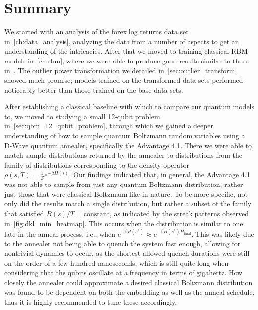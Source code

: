 \section{Summary}
We started with an analysis of the forex log returns data set in~\cref{ch:data_analysis}, analyzing the data from a number of aspects to get an understanding of the intricacies.
After that we moved to training classical RBM models in~\cref{ch:rbm}, where we were able to produce good results similar to those in~\cite{kondratyev_2019}.
The outlier power transformation we detailed in~\cref{sec:outlier_transform} showed much promise; models trained on the transformed data sets performed noticeably better than those trained on the base data sets.

After establishing a classical baseline with which to compare our quantum models to, we moved to studying a small 12-qubit problem in~\cref{sec:qbm_12_qubit_problem}, through which we gained a deeper understanding of how to sample quantum Boltzmann random variables using a D-Wave quantum annealer, specifically the Advantage 4.1.
There we were able to match sample distributions returned by the annealer to distributions from the family of distributions corresponding to the density operator \( \rho(s,T) = \frac{1}{Z}e^{-\beta H(s)} \).
Our findings indicated that, in general, the Advantage 4.1 was not able to sample from just any quantum Boltzmann distribution, rather just those that were classical Boltzmann-like in nature.
To be more specific, not only did the results match a single distribution, but rather a subset of the family that satisfied \( B(s) / T = \text{constant} \), as indicated by the streak patterns observed in~\cref{fig:dkl_min_heatmap}.
This occurs when the distribution is similar to one late in the anneal process, i.e., when \( e^{-\beta H(s^*)} \approx e^{-\beta B(s^*) H_\text{final}} \).
This was likely due to the annealer not being able to quench the system fast enough, allowing for nontrivial dynamics to occur, as the shortest allowed quench durations were still on the order of a few hundred nanoseconds, which is still quite long when considering that the qubits oscillate at a frequency in terms of gigahertz.
How closely the annealer could approximate a desired classical Boltzmann distribution was found to be dependent on both the embedding as well as the anneal schedule, thus it is highly recommended to tune these accordingly.

